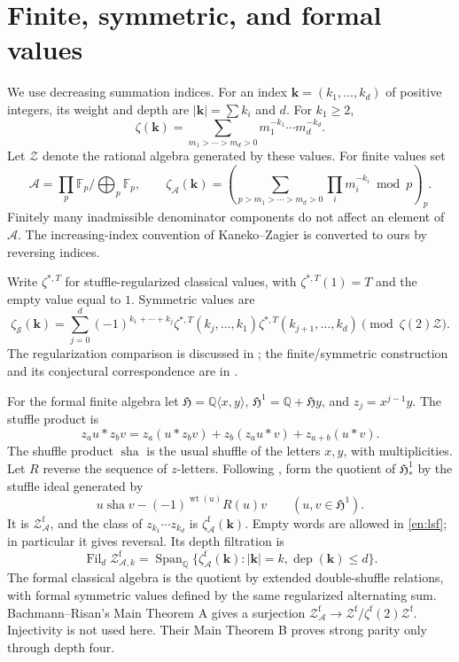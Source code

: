 \documentclass[12pt]{amsart}
\theoremstyle{definition}
\theoremstyle{remark}
\numberwithin{equation}{section}
\newcommand{\sha}{\operatorname{sha}}
\newcommand{\Q}{\mathbb{Q}}
\newcommand{\Fil}{\operatorname{Fil}}
\newcommand{\Span}{\operatorname{Span}}
\newcommand{\wt}{\operatorname{wt}}
\newcommand{\dep}{\operatorname{dep}}
\newcommand{\ZAf}{\mathcal Z_{\mathcal A}^{\mathrm f}}
\newcommand{\zf}{\zeta_{\mathcal A}^{\mathrm f}}
\newcommand{\za}{\zeta_{\mathcal A}}
\newcommand{\sh}{\mathbin{\sha}}
\theoremstyle{definition}
\theoremstyle{remark}
\begin{document}
\section{Finite, symmetric, and formal values}
We use decreasing summation indices. For an index
$\boldsymbol k=(k_1,\ldots,k_d)$ of positive integers, its weight and depth
are $|\boldsymbol k|=\sum k_i$ and $d$. For $k_1\geq2$,
\[
 \zeta(\boldsymbol k)=\sum_{m_1>\cdots>m_d>0}
 m_1^{-k_1}\cdots m_d^{-k_d}.
\]
Let $\mathcal Z$ denote the rational algebra generated by these values.
For finite values set
\[
 \mathcal A=\prod_p\mathbb F_p\big/\bigoplus_p\mathbb F_p,
 \qquad
 \za(\boldsymbol k)=
 \left(\sum_{p>m_1>\cdots>m_d>0}\prod_i m_i^{-k_i}\bmod p\right)_p.
\]
Finitely many inadmissible denominator components do not affect an element
of $\mathcal A$. The increasing-index convention of Kaneko--Zagier
\cite{KZ} is converted to ours by reversing indices.

Write $\zeta^{*,T}$ for stuffle-regularized classical values, with
$\zeta^{*,T}(1)=T$ and the empty value equal to $1$. Symmetric values are
\[
 \zeta_{\mathcal S}(\boldsymbol k)=
 \sum_{j=0}^d(-1)^{k_1+\cdots+k_j}
 \zeta^{*,T}(k_j,\ldots,k_1)
 \zeta^{*,T}(k_{j+1},\ldots,k_d)
 \pmod{\zeta(2)\mathcal Z}.
\]
The regularization comparison is discussed in
\cite[\S2, Theorem 1]{IKZ}; the finite/symmetric construction and its
conjectural correspondence are in \cite[\S\S7--9]{KZ}.

For the formal finite algebra let $\mathfrak H=\Q\langle x,y\rangle$,
$\mathfrak H^1=\Q+\mathfrak Hy$, and $z_j=x^{j-1}y$.
The stuffle product is
\[
 z_a u*z_b v=z_a(u*z_bv)+z_b(z_au*v)+z_{a+b}(u*v).
\]
The shuffle product $\sh$ is the usual shuffle of the letters $x,y$,
with multiplicities. Let $R$ reverse the sequence of $z$-letters.
Following \cite[Definition 3.1]{BR}, form the quotient of
$\mathfrak H^1_*$ by the stuffle ideal generated by
\begin{equation}\label{en:lsf}
 u\sh v-(-1)^{\wt(u)}R(u)v\qquad(u,v\in\mathfrak H^1).
\end{equation}
It is $\ZAf$, and the class of $z_{k_1}\cdots z_{k_d}$ is
$\zf(\boldsymbol k)$. Empty words are allowed in
\eqref{en:lsf}; in particular it gives reversal. Its depth filtration is
\[
 \Fil_d\mathcal Z^{\mathrm f}_{\mathcal A,k}
 =\Span_{\Q}\{\zf(\boldsymbol k):|\boldsymbol k|=k,
                      \dep(\boldsymbol k)\leq d\}.
\]
The formal classical algebra is the quotient by extended double-shuffle
relations, with formal symmetric values defined by the same regularized
alternating sum. Bachmann--Risan's Main Theorem A gives a surjection
$\ZAf\longrightarrow\mathcal Z^{\mathrm f}/\zeta^{\mathrm f}(2)
\mathcal Z^{\mathrm f}$. Injectivity is not used here.
Their Main Theorem B proves strong parity only through depth four.
\end{document}
